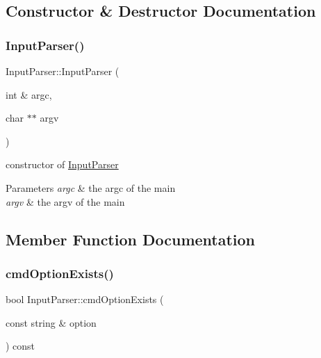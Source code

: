\subsection{Constructor \& Destructor Documentation}
\mbox{\label{class_input_parser_af9fa5ead1f28b5294a713410df5b9531}} 
\subsubsection{\texorpdfstring{Input\+Parser()}{InputParser()}}
{\footnotesize\ttfamily Input\+Parser\+::\+Input\+Parser (\begin{DoxyParamCaption}\item[{int \&}]{argc,  }\item[{char $\ast$$\ast$}]{argv }\end{DoxyParamCaption})}



constructor of \mbox{\hyperlink{class_input_parser}{Input\+Parser}} 


\begin{DoxyParams}{Parameters}
{\em argc} & the argc of the main \\
\hline
{\em argv} & the argv of the main \\
\hline
\end{DoxyParams}


\subsection{Member Function Documentation}
\mbox{\label{class_input_parser_ad3d06a9c59e91f425295bdc8408e0544}} 
\subsubsection{\texorpdfstring{cmd\+Option\+Exists()}{cmdOptionExists()}}
{\footnotesize\ttfamily bool Input\+Parser\+::cmd\+Option\+Exists (\begin{DoxyParamCaption}\item[{const string \&}]{option }\end{DoxyParamCaption}) const}



